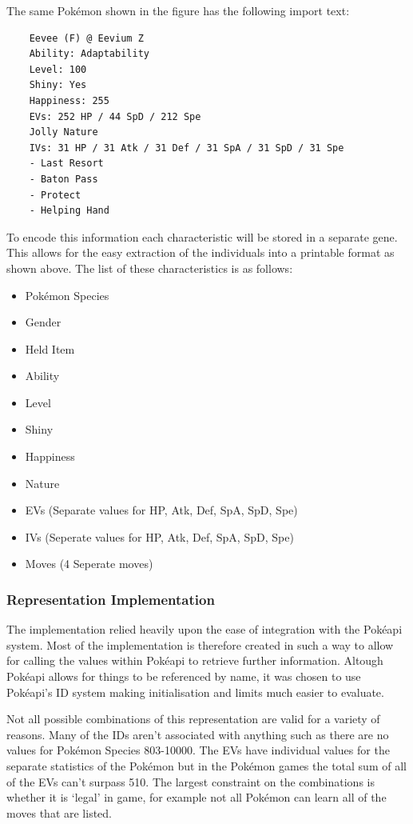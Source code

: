 \documentclass[a4paper]{article}
\newcommand{\Pokemon}{Pok\'{e}mon}
\newcommand{\Pokeapi}{Pok\'{e}api}
\begin{document}
\par
The same \Pokemon{} shown in the figure has the following import text:
\begin{center}
	\begin{lstlisting}
	Eevee (F) @ Eevium Z
	Ability: Adaptability
	Level: 100
	Shiny: Yes
	Happiness: 255
	EVs: 252 HP / 44 SpD / 212 Spe
	Jolly Nature
	IVs: 31 HP / 31 Atk / 31 Def / 31 SpA / 31 SpD / 31 Spe
	- Last Resort
	- Baton Pass
	- Protect
	- Helping Hand
	\end{lstlisting}
\end{center}
\par
To encode this information each characteristic will be stored in a separate gene.
This allows for the easy extraction of the individuals into a printable format as shown above.
The list of these characteristics is as follows:
\begin{multicols}{2}
	\begin{itemize}
		\item \Pokemon{} Species
		\item Gender
		\item Held Item
		\item Ability
		\item Level
		\item Shiny
		\item Happiness
		\item Nature
		\item EVs (Separate values for HP, Atk, Def, SpA, SpD, Spe)
		\item IVs (Seperate values for HP, Atk, Def, SpA, SpD, Spe)
		\item Moves (4 Seperate moves)
	\end{itemize}
\end{multicols}
\subsubsection{Representation Implementation}
\par
The implementation relied heavily upon the ease of integration with the \Pokeapi{} system.
Most of the implementation is therefore created in such a way to allow for calling the values within \Pokeapi{} to retrieve further information.
Altough \Pokeapi{} allows for things to be referenced by name, it was chosen to use \Pokeapi{}'s ID system making initialisation and limits much easier to evaluate.
\par
Not all possible combinations of this representation are valid for a variety of reasons.
Many of the IDs aren't associated with anything such as there are no values for \Pokemon{} Species 803-10000.
The EVs have individual values for the separate statistics of the \Pokemon{} but in the \Pokemon{} games the total sum of all of the EVs can't surpass 510.
The largest constraint on the combinations is whether it is `legal' in game, for example not all \Pokemon{} can learn all of the moves that are listed.
\end{document}
